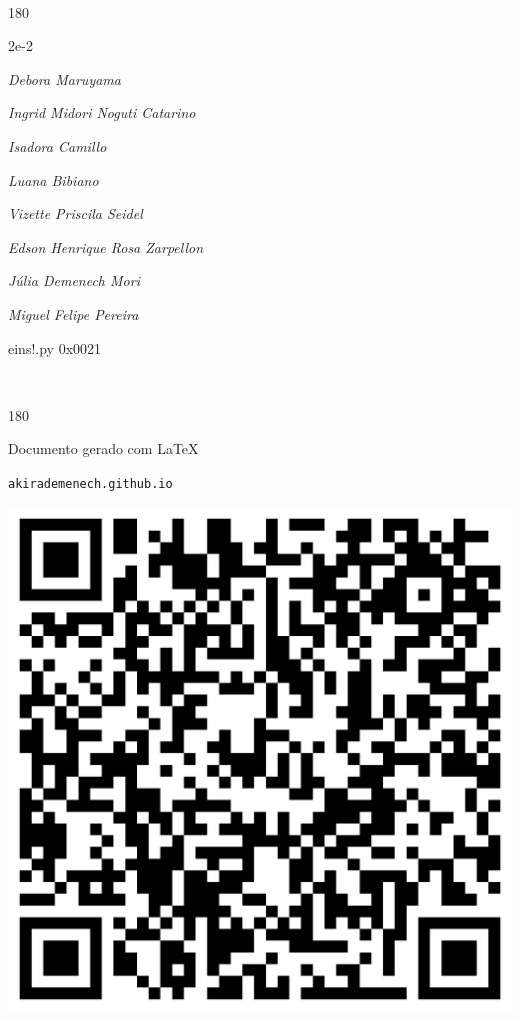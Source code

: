\documentclass[12pt]{article}
\begin{document}
\pagebreak			

	\ 
	\vfill
	\begin{turn}{180}	
		\begin{minipage}{\textwidth}
		  	\ttfamily %
			\centering
			{\Huge 2e-2}
		  
			\hfill
		  
			

\textit{\small Debora Maruyama}

\textit{\small Ingrid Midori Noguti Catarino}

\textit{\small Isadora Camillo}

\textit{\small Luana Bibiano}

\textit{\small Vizette Priscila Seidel}

\textit{\small Edson Henrique Rosa Zarpellon}

\textit{\small Júlia Demenech Mori}

\textit{\small Miguel Felipe Pereira}

\bigskip

eins!.py
0x0021


		\end{minipage}	
	\end{turn}
	\vfill
	\

\pagebreak

	\begin{turn}{180}	
		\begin{minipage}{\textwidth}		  
		  Documento gerado com \LaTeX			
		  
		  \texttt{akirademenech.github.io}

		  \includegraphics[height=0.3\textheight]{2e-2.pdf}

		\end{minipage}	
	\end{turn}  
		  
\end{document}
